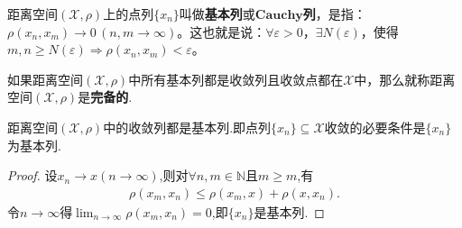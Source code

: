 \documentclass[../../main.tex]{subfiles}%
\begin{document}
\begin{definition}
距离空间$(\mathscr{X},\rho)$上的点列$\{x_n\}$叫做\textbf{基本列}或$\mathbf{Cauchy}$\textbf{列}，是指：$\rho(x_n,x_m) \to 0\,(n,m \to \infty)$。这也就是说：$\forall \varepsilon > 0$，$\exists N(\varepsilon)$，使得$m,n \geqslant N(\varepsilon) \Rightarrow \rho(x_n,x_m) < \varepsilon$。

如果距离空间$(\mathscr{X},\rho)$中所有基本列都是收敛列且收敛点都在$\mathscr{X}$中，那么就称距离空间$(\mathscr{X},\rho)$是\textbf{完备的}.
\end{definition}

\begin{proposition}\label{proposition:收敛列必是基本列}
距离空间$(\mathscr{X},\rho)$中的收敛列都是基本列.即点列$\{x_n\}\subseteq \mathscr{X}$收敛的必要条件是$\{x_n\}$为基本列.
\end{proposition}
\begin{proof}

设$x_n\to x(n\to \infty)$,则对$\forall n,m\in \mathbb{N}$且$m\geqslant m$,有
\begin{align*}
\rho(x_m,x_n)\leqslant \rho(x_m,x)+\rho (x,x_n).
\end{align*}
令$n\to \infty$得$\lim_{n\to \infty}\rho(x_m,x_n)=0$,即$\{x_n\}$是基本列.
\end{proof}
\end{document}
